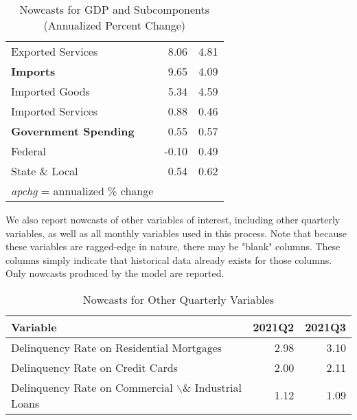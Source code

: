 \documentclass[11pt, letterpaper]{article}\usepackage[]{graphicx}\usepackage[]{color}
\begin{document}
\begin{table}[H]
\begin{tabular}{lrr}
  \hspace{8mm}  Exported Services & 8.06 & 4.81 \\ 
  \hspace{0mm} \textbf{Imports} & 9.65 & 4.09 \\ 
  \hspace{8mm}  Imported Goods & 5.34 & 4.59 \\ 
  \hspace{8mm}  Imported Services & 0.88 & 0.46 \\ 
  \hspace{0mm} \textbf{Government Spending} & 0.55 & 0.57 \\ 
  \hspace{8mm}  Federal & -0.10 & 0.49 \\ 
  \hspace{8mm}  State \& Local & 0.54 & 0.62 \\ 
   \hline 
 \textit{apchg} = annualized \% change 
\end{tabular}
\endgroup
\caption{Nowcasts for GDP and Subcomponents (Annualized Percent Change)} 
\end{table}


We also report nowcasts of other variables of interest, including other quarterly variables, as well as all monthly variables used in this process. Note that because these variables are ragged-edge in nature, there may be "blank" columns. These columns simply indicate that historical data already exists for those columns. Only nowcasts produced by the model are reported.
\begin{table}[H]
\centering
\begingroup\fontsize{11pt}{13pt}\selectfont
\begin{tabular}{lrr}
  \hline
Variable & 2021Q2 & 2021Q3 \\ 
  \hline
Delinquency Rate on Residential Mortgages & 2.98 & 3.10 \\ 
  Delinquency Rate on Credit Cards & 2.00 & 2.11 \\ 
  Delinquency Rate on Commercial $\backslash$\& Industrial Loans & 1.12 & 1.09 \\ 
   \hline
\end{tabular}
\endgroup
\caption{Nowcasts for Other Quarterly Variables} 
\end{table}
\end{document}
